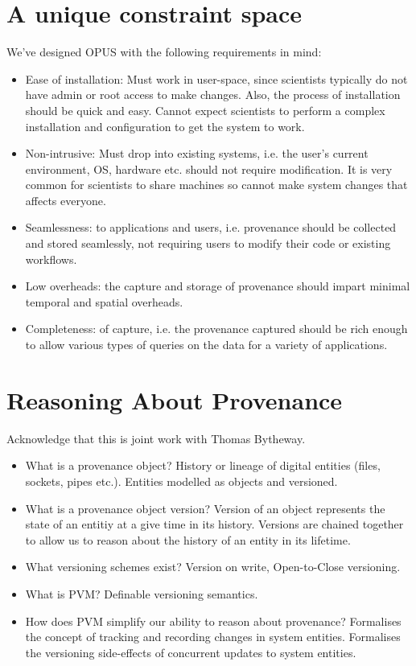 \documentclass[withindex,glossary]{cam-thesis}
\begin{document}
\section{A unique constraint space}
We've designed OPUS with the following requirements in mind:
\begin{itemize}
\item Ease of installation: Must work in user-space, since scientists typically do not have admin or root access to make changes. Also, the process of installation should be quick and easy. Cannot expect scientists to perform a complex installation and configuration to get the system to work.
\item Non-intrusive: Must drop into existing systems, i.e. the user's current environment, OS, hardware etc. should not require modification. 
It is very common for scientists to share machines so cannot make system changes that affects everyone.
\item Seamlessness: to applications and users, i.e. provenance should be collected and stored seamlessly, not requiring users to modify their code or existing workflows.
\item Low overheads: the capture and storage of provenance should impart minimal temporal and spatial overheads.
\item Completeness: of capture, i.e. the provenance captured should be rich enough to allow various types of queries on the data for a variety of applications.
\end{itemize}

\section{Reasoning About Provenance}
Acknowledge that this is joint work with Thomas Bytheway.
\begin{itemize}
\item What is a provenance object? History or lineage of digital entities (files, sockets, pipes etc.). Entities modelled as objects and versioned.
\item What is a provenance object version? Version of an object represents the state of an entitiy at a give time in its history. Versions are chained together to allow us to reason about the history of an entity in its lifetime.
\item What versioning schemes exist? Version on write, Open-to-Close versioning.
\item What is PVM? Definable versioning semantics.
\item How does PVM simplify our ability to reason about provenance?
Formalises the concept of tracking and recording changes in system entities.
Formalises the versioning side-effects of concurrent updates to system entities.
\end{itemize}
\end{document}
